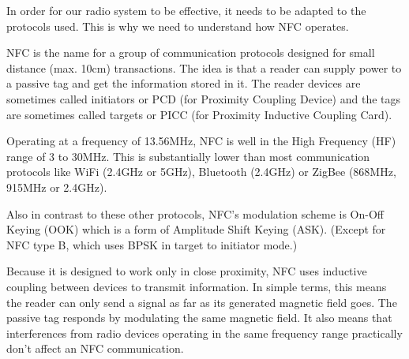 In order for our radio system to be effective, it needs to be adapted to the protocols used. This is why we need to understand how NFC operates.

NFC is the name for a group of communication protocols designed for small distance (max. 10cm) transactions. The idea is that a reader can supply power to a passive tag and get the information stored in it. The reader devices are sometimes called initiators or PCD (for Proximity Coupling Device) and the tags are sometimes called targets or PICC (for Proximity Inductive Coupling Card).

Operating at a frequency of 13.56MHz, NFC is well in the High Frequency (HF) range of 3 to 30MHz. This is substantially lower than most communication protocols like WiFi (2.4GHz or 5GHz), Bluetooth (2.4GHz) or ZigBee (868MHz, 915MHz or 2.4GHz).

Also in contrast to these other protocols, NFC's modulation scheme is On-Off Keying (OOK) which is a form of Amplitude Shift Keying (ASK). (Except for NFC type B, which uses BPSK in target to initiator mode.)

Because it is designed to work only in close proximity, NFC uses inductive coupling between devices to transmit information. In simple terms, this means the reader can only send a signal as far as its generated magnetic field goes. The passive tag responds by modulating the same magnetic field. It also means that interferences from radio devices operating in the same frequency range practically don't affect an NFC communication. \cite{wiki_near-field_2020}
